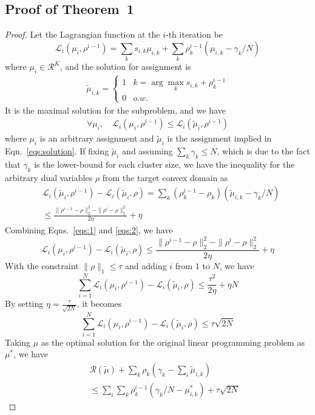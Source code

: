 \documentclass[10pt,twocolumn,letterpaper]{article}
\def \R {\mathcal{R}}
\def \LL {\mathcal{L}}
\begin{document}
\subsection{Proof of Theorem~1}
\begin{proof}
Let the Lagrangian function at the $i$-th iteration be
\[\LL_i(\mu_i,\rho^{i-1}) = \sum_k s_{i,k}\mu_{i,k} + \sum_k\rho_k^{i-1}(\mu_{i,k}-\gamma_k/N)\]
where $\mu_i\in\R^{K}$,
and the solution for assignment is 
\begin{eqnarray}\label{eqs:solution}
\tilde{\mu}_{i,k} = \left\{\begin{array}{cc}1&k=\arg\max_k s_{i,k}+\rho_k^{i-1}\\0&o.w.\end{array}\right.
\end{eqnarray}
It is the maximal solution for the subproblem, and we have
\begin{eqnarray}\label{eqs:1}
\forall \mu_i,\quad \LL_i(\mu_i,\rho^{i-1})\leq \LL_i(\tilde{\mu}_i,\rho^{i-1})
\end{eqnarray}
where $\mu_i$ is an arbitrary assignment and $\tilde{\mu}_i$ is the assignment implied in Eqn.~\ref{eqs:solution}.
If fixing $\tilde{\mu}_i$ and assuming $\sum_k \gamma_k\leq N$, which is due to the fact that $\gamma_k$ is the lower-bound for each cluster size, we have the inequality for the arbitrary dual variables $\rho$ from the target convex domain as
\begin{align}\label{eqs:2}
&\LL_i(\tilde{\mu}_i,\rho^{i-1})-\LL_i(\tilde{\mu}_i,\rho)   = \sum_k(\rho_k^{i-1}-\rho_k)(\tilde{\mu}_{i,k}-\gamma_k/N) \nonumber\\
&\leq \frac{\|\rho^{i-1}-\rho\|_2^2-\|\rho^{i}-\rho \|_2^2}{2\eta} + \eta
\end{align}
Combining Eqns.~\ref{eqs:1} and \ref{eqs:2}, we have
\[\LL_i(\mu_i,\rho^{i-1})-\LL_i(\tilde{\mu}_i,\rho) \leq \frac{\|\rho^{i-1}-\rho\|_2^2-\|\rho^{i}-\rho \|_2^2}{2\eta} + \eta\]
With the constraint $\|\rho\|_1\leq \tau$ and adding $i$ from $1$ to $N$, we have
\[\sum_{i=1}^N \LL_i(\mu_i,\rho^{i-1})-\LL_i(\tilde{\mu}_i,\rho) \leq \frac{\tau^2}{2\eta}+\eta N\]
By setting $\eta = \frac{\tau}{\sqrt{2N}}$, it becomes
\[\sum_{i=1}^N \LL_i(\mu_i,\rho^{i-1})-\LL_i(\tilde{\mu}_i,\rho) \leq \tau\sqrt{2N}\]
Taking $\mu$ as the optimal solution for the original linear programming problem as $\mu^*$, we have
\begin{eqnarray*}
&&\R(\tilde{\mu}) + \sum_k\rho_k(\gamma_k-\sum_i\tilde{\mu}_{i,k})\\
&&\leq \sum_i \sum_k\rho_k^{i-1}(\gamma_k/N-\mu_{i,k}^*)+\tau\sqrt{2N}

\end{eqnarray*}
\end{proof}
\end{document}
